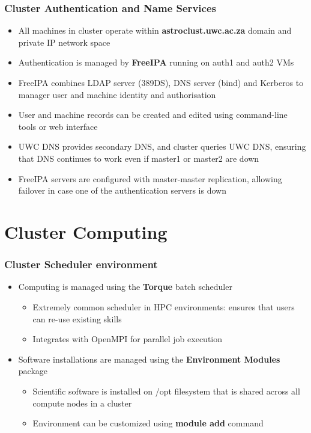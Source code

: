 \documentclass[handout]{beamer}
\begin{document}
\begin{frame}
\frametitle{Cluster Authentication and Name Services}
\begin{itemize}
\item All machines in cluster operate within \textbf{astroclust.uwc.ac.za} domain and private IP network space
\item Authentication is managed by \textbf{FreeIPA} running on auth1 and auth2 VMs
\item FreeIPA combines LDAP server (389DS), DNS server (bind) and Kerberos to manager user and machine identity and authorisation
\item User and machine records can be created and edited using command-line tools or web interface
\item UWC DNS provides secondary DNS, and cluster queries UWC DNS, ensuring that DNS continues to work even if master1 or master2 are down
\item FreeIPA servers are configured with master-master replication, allowing failover in case one of the authentication servers is down
\end{itemize}
\end{frame}

\section{Cluster Computing}

\begin{frame}
\frametitle{Cluster Scheduler environment}
\begin{itemize}
\item Computing is managed using the \textbf{Torque} batch scheduler
\begin{itemize}
\item Extremely common scheduler in HPC environments: ensures that users can re-use existing skills
\item Integrates with OpenMPI for parallel job execution
\end{itemize}
\item Software installations are managed using the \textbf{Environment Modules} package
\begin{itemize}
\item Scientific software is installed on /opt filesystem that is shared across all compute nodes in a cluster
\item Environment can be customized using \textbf{module add} command 
\end{itemize}

\end{itemize}
\end{frame}
\end{document}
